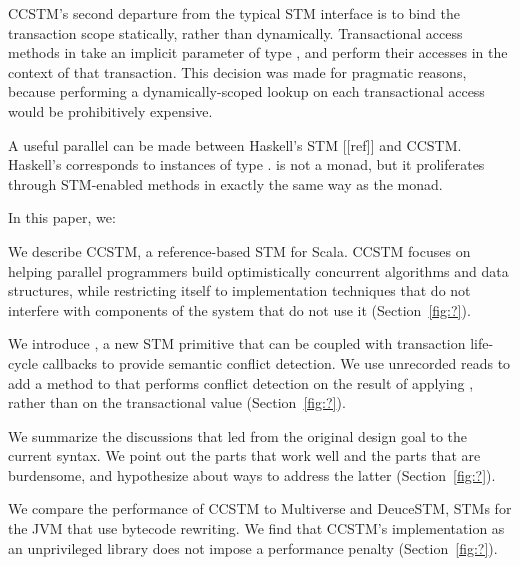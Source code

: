 CCSTM's second departure from the typical STM interface is to bind the
transaction scope statically, rather than dynamically.  Transactional access
methods in  take an implicit parameter of type , and
perform their accesses in the context of that transaction.  This decision
was made for pragmatic reasons, because performing a dynamically-scoped
lookup on each transactional access would be prohibitively expensive.

A useful parallel can be made between Haskell's STM [[ref]] and CCSTM.
Haskell's  corresponds to instances of type .
 is not a monad, but it proliferates through STM-enabled
methods in exactly the same way as the  monad.

In this paper, we:
\begin{packed_enum}

\item We describe CCSTM, a reference-based STM for Scala.  CCSTM focuses on
helping parallel programmers build optimistically concurrent algorithms
and data structures, while restricting itself to implementation techniques
that do not interfere with components of the system that do not use it
(Section~\ref{fig:?}).

\item We introduce , a new STM primitive that can be coupled with
transaction life-cycle callbacks to provide semantic conflict detection.  We use
unrecorded reads to add a  method to  that performs
conflict detection on the result of applying , rather than on the
transactional value (Section~\ref{fig:?}).

\item We summarize the discussions that led from the original design goal to
the current syntax.  We point out the parts that work well and the parts that
are burdensome, and hypothesize about ways to address the latter
(Section~\ref{fig:?}).

\item We compare the performance of CCSTM to Multiverse and DeuceSTM, STMs for
the JVM that use bytecode rewriting.  We find that CCSTM's implementation as an
unprivileged library does not impose a performance penalty
(Section~\ref{fig:?}).  

\end{packed_enum}

